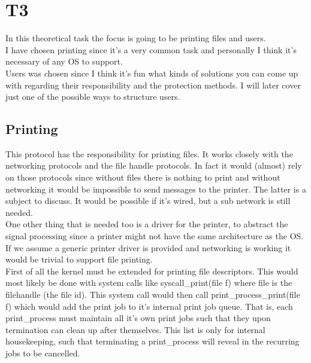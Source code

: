 \documentclass[]{article}
\begin{document}

\section*{T3}

In this theoretical task the focus is going to be printing files and users. \\

I have chosen printing since it's a very common task and personally I think it's necessary of any OS to support.\\

Users was chosen since I think it's fun what kinds of solutions you can come up with regarding their responsibility and the protection methods. I will later cover just one of the possible ways to structure users.  

\subsection*{Printing}

This protocol has the responsibility for printing files. It works closely with the networking protocols and the file handle protocols. In fact it would (almost) rely on those protocols since without files there is nothing to print and without networking it would be impossible to send messages to the printer. The latter is a subject to discuss. It would be possible if it's wired, but a sub network is still needed.\\

One other thing that is needed too is a driver for the printer, to abstract the signal processing since a printer might not have the same architecture as the OS. If we assume a generic printer driver is provided and networking is working it would be trivial to support file printing.\\

First of all the kernel must be extended for printing file descriptors. This would most likely be done with system calls like syscall\_print(file f) where file is the filehandle (the file id). This system call would then call print\_process\_print(file f) which would add the print job to it's internal print job queue. That is, each print\_process must maintain all it's own print jobs such that they upon termination can clean up after themselves. This list is only for internal housekeeping, such that terminating a print\_process will reveal in the recurring jobs to be cancelled.\\
\end{document}
